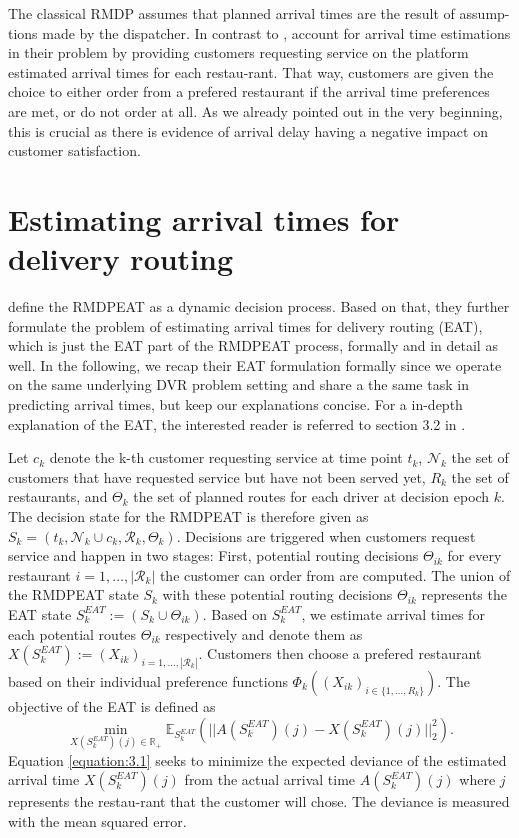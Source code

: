 The classical RMDP assumes that planned arrival times are the result of assump-tions made by the dispatcher. In contrast to \citet{UlmerRMDP}, \citet{Hildebrandt2020_EAT} account for arrival time estimations in their problem by providing customers requesting service on the platform estimated arrival times for each restau-rant. That way, customers are given the choice to either order from a prefered restaurant if the arrival time preferences are met, or do not order at all. As we already pointed out in the very beginning, this is crucial as there is evidence of arrival delay having a negative impact on customer satisfaction. 

\section{Estimating arrival times for delivery routing}

\cite{Hildebrandt2020_EAT} define the RMDPEAT as a dynamic decision process. Based on that, they further formulate the problem of estimating arrival times for delivery routing (EAT), which is just the EAT part of the RMDPEAT process, formally and in detail as well. In the following, we recap their EAT formulation formally since we operate on the same underlying DVR problem setting and share a the same task in predicting arrival times, but keep our explanations concise. For a in-depth explanation of the EAT, the interested reader is referred to section 3.2 in \cite{Hildebrandt2020_EAT}. 

Let $ c_k $ denote the k-th customer requesting service at time point $ t_k $, $ \mathcal{N}_k $ the set of customers that have requested service but have not been served yet, $ R_k $ the set of restaurants, and $ \Theta_k $ the set of planned routes for each driver at decision epoch $ k $. The decision state for the RMDPEAT is therefore given as $ S_k = (t_k, \mathcal{N}_k \cup c_k, \mathcal{R}_k, \Theta_k) $. Decisions are triggered when customers request service and happen in two stages: First, potential routing decisions $ \Theta_{ik} $ for every restaurant $ i = 1, \dots, |\mathcal{R}_k| $ the customer can order from are computed. The union of the RMDPEAT state $ S_k $ with these potential routing decisions $ \Theta_{ik} $ represents the EAT state $ S^{EAT}_k := (S_k \cup \Theta_{ik})$. Based on $ S^{EAT}_k $, we estimate arrival times for each potential routes $ \Theta_{ik} $ respectively and denote them as $ X(S^{EAT}_k) := (X_{ik})_{i = 1, \dots, |\mathcal{R}_k|}$. Customers then choose a prefered restaurant based on their individual preference functions $ \Phi_k((X_{ik})_{i \in \{1,\dots, R_k\}}) $.  
The objective of the EAT is defined as
\begin{equation}\label{equation:3.1}
	\min_{X(S^{EAT}_k)(j) \in \mathbb{R}_+} 
	\mathbb{E}_{S^{EAT}_{k}} 
	(|| A(S^{EAT}_{k})(j) - X(S^{EAT}_{k})(j)||^{2}_{2}).
\end{equation}
Equation \ref{equation:3.1} seeks to minimize the expected deviance of the estimated arrival time $ X(S^{EAT}_{k})(j) $ from the actual arrival time $ A(S^{EAT}_{k})(j) $ where $ j $ represents the restau-rant that the customer will chose. The deviance is measured with the mean squared error. 


